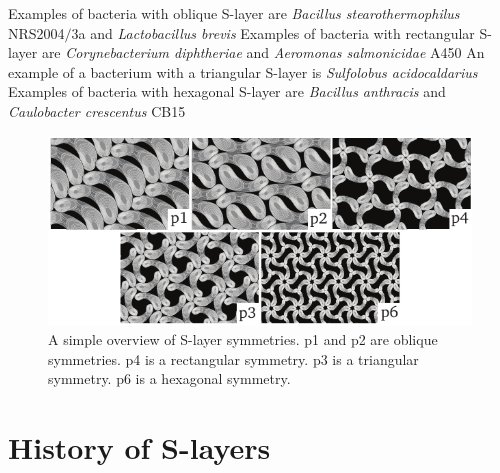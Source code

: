             Examples of bacteria with oblique \acs{S-layer} are \textit{Bacillus stearothermophilus} NRS2004$/$3a and \textit{Lactobacillus brevis}
            Examples of bacteria with rectangular \acs{S-layer} are \textit{Corynebacterium diphtheriae} and \textit{Aeromonas salmonicidae} A450
            An example of a bacterium with a triangular \ac{S-layer} is \textit{Sulfolobus acidocaldarius}
            Examples of bacteria with hexagonal \acs{S-layer} are
            \textit{Bacillus
            anthracis} and
            \textit{Caulobacter crescentus} CB15

        \begin{figure}[htb] %
                \begin{center}
                    \includegraphics[]{intro/img/symmetries.pdf}
                \end{center}
                \caption[A simple overview of \ac{S-layer} symmetries]{A simple overview of \ac{S-layer} symmetries. p1 and p2 are oblique symmetries. 
                p4 is a rectangular symmetry.  
                p3  is a triangular symmetry. 
                p6 is a hexagonal symmetry.}
        \label{fig:symmetries}
        \end{figure}


    \section{History of S-layers} %
    \label{sec:history_of_s_layers}


